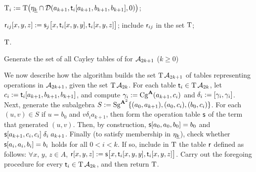   \begin{algorithm}
  
    
     {
    
      $\operatorname{T}_i := \operatorname{T} \bigl(\eta_{\underline{k}} \cap \mathcal{D} (a_{k+1}, \mathsf{t}_i[a_{k+1}, b_{k+1}, b_{k+1}], 0)\bigr)$;
   
       {
          {
          $\mathsf{r}_{ij}[x,y,z] :=  \mathsf{s}_j\bigl[x, \mathsf{t}_i[x,y,y], \mathsf{t}_i[x,y,z]\bigr]$;
        }
        include $\mathsf{r}_{ij}$ in the set $\operatorname{T}$;
      }
    }
  
    \Return $\operatorname{T}$. %
    \caption{Generate the set of all Cayley tables of \ldtos for $\mathcal{A}_{2k+1}$ \label{alg:stream-ldt1} {\small ($k\geq 0$)}}
  \end{algorithm}
    
  We now describe how the algorithm builds the set 
  $\operatorname{T} \mathcal{A}_{2k+1}$ of tables representing operations in $\mathcal{A}_{2k+1}$, given the set
  $\operatorname{T} \mathcal{A}_{2k}$.
  For each table $\mathsf{t}_i \in \operatorname{T} \mathcal{A}_{2k}$,
  let $c_i:= \mathsf{t}_i[a_{k+1}, b_{k+1}, b_{k+1}]$, and compute
  $\gamma_i := \operatorname{Cg}^{\mathbf{A}}(a_{k+1}, c_i)$ and $\delta_i := [\gamma_i, \gamma_i]$. %
  Next, generate the subalgebra $S:=\operatorname{Sg}^{\mathbf{A}^2}\{(a_0,a_{k+1}), (a_0,c_i), (b_0,c_i)\}$.
  For each $(u,v) \in S$ if $u=b_0$ and $v \mathrel{\delta_i} a_{k+1}$, then 
  form the operation table $\mathsf{s}$ of the term that generated $(u,v)$.  
  Then, by construction, $\mathsf{s}[a_0, a_0, b_0] = b_0$ and 
  $\mathsf{s}[a_{k+1},c_i,c_i] \mathrel{\delta_i} a_{k+1}$.  
  Finally (to satisfy membership in $\eta_{\underline{k}}$), 
  check whether $\mathsf{s}[a_i, a_i, b_i] = b_i$ holds for all $0< i< k$.  
  If so, include in $\operatorname{T}$ the table $\mathsf{r}$ defined as follows:
  $\forall x$, $y$, $z \in A$, 
    $\mathsf{r}[x,y,z] :=  \mathsf{s}\bigl[x, \mathsf{t}_i[x,y,y], \mathsf{t}_i[x,y,z]\bigr]$.
  Carry out the foregoing procedure for every $\mathsf{t}_i \in \operatorname{T} \mathcal{A}_{2k}$, 
  and then return $\operatorname{T}$.
  
  
